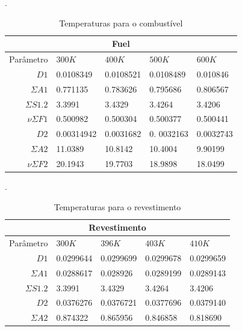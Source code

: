 \begin{table}[htb]
  \caption[Temperaturas para combustível.]{Temperaturas para o combustível}.
  \label{tab:temp-fuel}
  \begin{tabular}{r l l l l}
  \multicolumn{5}{c}{Fuel} \\
  \hline
  Parâmetro & $300K$ & $400K$ & $500K$ & $600K$ \\
  \hline
  $D1$ & 0.0108349 & 0.0108521 & 0.0108489 & 0.010846\\
  $\Sigma A1$ & 0.771135 & 0.783626 & 0.795686 & 0.806567\\
  $\Sigma S1.2$ & 3.3991 & 3.4329 & 3.4264 & 3.4206\\
  $\nu \Sigma F1$ & 0.500982 & 0.500304 & 0.500377 & 0.500441\\
  \hline
  $D2$ & 0.00314942 & 0.0031682 & 0. 0032163 & 0.0032743 \\
  $\Sigma A2$ & 11.0389 & 10.8142 & 10.4004 & 9.90199\\
  $\nu \Sigma F2$ & 20.1943 & 19.7703 & 18.9898 & 18.0499\\
  \hline
\end{tabular}
\end{table}

\begin{table}[htb]
  \caption[Temperaturas para o revestimento.]{Temperaturas para o revestimento}.
  \label{tab:temp-cladding}
  \begin{tabular}{r l l l l}
    \multicolumn{5}{c}{Revestimento} \\
    \hline
    Parâmetro & $300K$ & $396K$ & $403K$ & $410K$ \\
    \hline
    $D1$ & 0.0299644 & 0.0299699 & 0.0299678 & 0.0299659 \\
    $\Sigma A1$ & 0.0288617 & 0.028926 & 0.0289199 & 0.0289143 \\
    $\Sigma S1.2$ & 3.3991 & 3.4329 & 3.4264 & 3.4206\\
    \hline
    $D2$ & 0.0376276 & 0.0376721 & 0.0377696 & 0.0379140\\
    $\Sigma A2$ & 0.874322 & 0.865956 & 0.846858 & 0.818690\\
    \hline
  \end{tabular}
\end{table}

